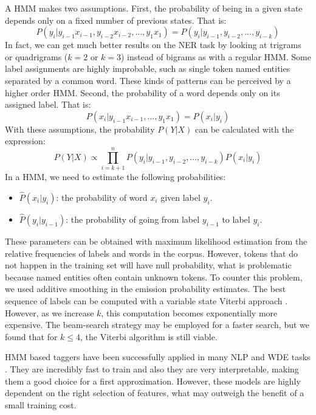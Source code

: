 \documentclass{nle}
\begin{document}
A HMM makes two assumptions. First, the probability of being in a given state depends 
only on a fixed number of previous states. That is:
%
\begin{equation}
P(y_i|y_{i-1}x_{i-1}, y_{i-2}x_{i-2}, ..., y_1x_1) = P(y_i|y_{i-1}, y_{i-2},..., y_{i-k})
\end{equation}
%
In fact, we can get much better results on the NER task by looking at trigrams
or quadrigrams ($ k = 2 $ or $ k = 3 $) instead of bigrams as with a regular HMM. 
Some label assignments are highly improbable, such as single token named entities 
separated by a common word. These kinds of patterns can be perceived by a higher order HMM.
Second, the probability of a word depends only on its assigned label. That is:
%
\begin{equation}
P(x_i|y_{i-1}x_{i-1}, ..., y_1x_1) = P(x_i|y_i)
\end{equation}
%
With these assumptions, 
the probability $ P(Y|X) $ can be calculated with the expression:
%
\begin{equation}
P(Y|X) \propto \prod_{i=k+1}^{n} P(y_i|y_{i-1}, y_{i-2}, ..., y_{i-k}) P(x_i|y_i)
\end{equation}
%
In a HMM, we need to estimate the following probabilities:
%
\begin{itemize}
  \item $ \hat{P}(x_i|y_i) $: the probability of word $ x_i $ given label $ y_i $.
  \item $ \hat{P}(y_i|y_{i-1}) $: the probability of going from label $ y_{i-1} $ to label $ y_i $.
\end{itemize}
%
These parameters can be obtained with maximum likelihood estimation from the relative
frequencies of labels and words in the corpus. However, tokens that do not happen in the
training set will have null probability, what is problematic because named entities often
contain unknown tokens. To counter this problem, we used additive smoothing in the 
emission probability estimates.
The best sequence of labels can be computed 
with a variable state Viterbi approach \cite{Li2000}. However, as we increase $ k $, this computation 
becomes exponentially more expensive. The beam-search strategy may be employed for a faster 
search, but we found that for $ k \leq 4 $, the Viterbi algorithm is still viable.

HMM based taggers have been successfully applied in many NLP and WDE tasks 
\cite{Rabiner1990,Freitag2000}. They are incredibly fast to train and also they are very 
interpretable, making them a good choice for a first approximation. However, these models 
are highly dependent on the right selection of features, what may outweigh the benefit of a 
small training cost.
\end{document}
